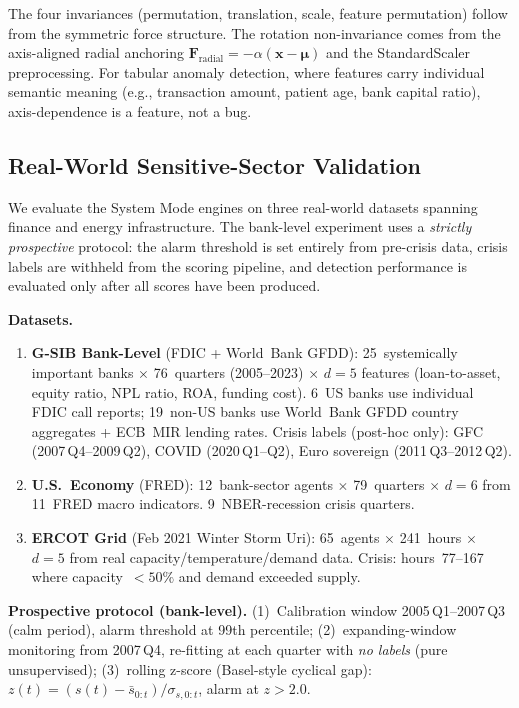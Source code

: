 \documentclass{article}
\begin{document}
The four invariances (permutation, translation, scale, feature permutation) follow from the symmetric force structure. The rotation non-invariance comes from the axis-aligned radial anchoring $\mathbf{F}_{\text{radial}} = -\alpha(\mathbf{x} - \bm{\mu})$ and the StandardScaler preprocessing. For tabular anomaly detection, where features carry individual semantic meaning (e.g., transaction amount, patient age, bank capital ratio), axis-dependence is a feature, not a bug.

\subsection{Real-World Sensitive-Sector Validation}
\label{ssec:realworld}

We evaluate the System Mode engines on three real-world datasets spanning finance and energy infrastructure. The bank-level experiment uses a \emph{strictly prospective} protocol: the alarm threshold is set entirely from pre-crisis data, crisis labels are withheld from the scoring pipeline, and detection performance is evaluated only after all scores have been produced.

\textbf{Datasets.}
\begin{enumerate}[leftmargin=*]
  \item \textbf{G-SIB Bank-Level} (FDIC + World~Bank GFDD): 25~systemically important banks $\times$ 76~quarters (2005--2023) $\times$ $d{=}5$ features (loan-to-asset, equity ratio, NPL ratio, ROA, funding cost). 6~US banks use individual FDIC call reports; 19~non-US banks use World~Bank GFDD country aggregates + ECB~MIR lending rates. Crisis labels (post-hoc only): GFC (2007\,Q4--2009\,Q2), COVID (2020\,Q1--Q2), Euro sovereign (2011\,Q3--2012\,Q2).
  \item \textbf{U.S.\ Economy} (FRED): 12~bank-sector agents $\times$ 79~quarters $\times$ $d{=}6$ from 11~FRED macro indicators. 9~NBER-recession crisis quarters.
  \item \textbf{ERCOT Grid} (Feb 2021 Winter Storm Uri): 65~agents $\times$ 241~hours $\times$ $d{=}5$ from real capacity/temperature/demand data. Crisis: hours~77--167 where capacity~$< 50\%$ and demand exceeded supply.
\end{enumerate}

\textbf{Prospective protocol (bank-level).} (1)~Calibration window 2005\,Q1--2007\,Q3 (calm period), alarm threshold at 99th percentile; (2)~expanding-window monitoring from 2007\,Q4, re-fitting at each quarter with \emph{no labels} (pure unsupervised); (3)~rolling z-score (Basel-style cyclical gap): $z(t) = (s(t) - \bar{s}_{0:t}) / \sigma_{s,0:t}$, alarm at $z > 2.0$.
\end{document}
